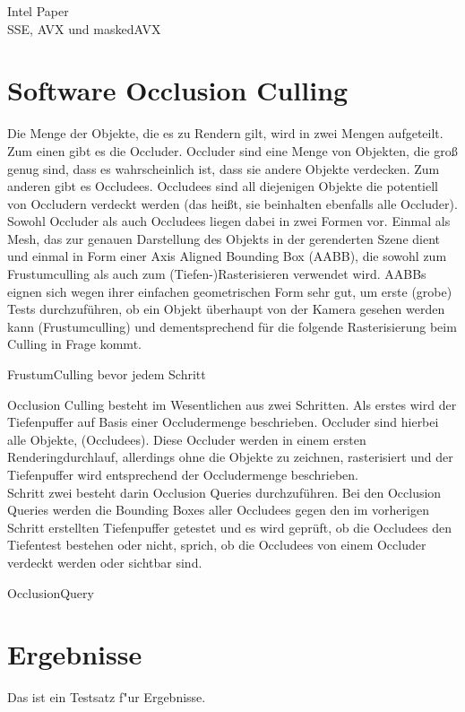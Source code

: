 \documentclass[journal]{vgtc}
\begin{document}
Intel Paper \cite{hpg.20161189}\\
SSE, AVX und maskedAVX\\


\section{Software Occlusion Culling}
Die Menge der Objekte, die es zu Rendern gilt, wird in zwei Mengen aufgeteilt. Zum einen gibt es die Occluder. Occluder sind eine Menge von Objekten, die gro\ss{} genug sind, dass es wahrscheinlich ist, dass sie andere Objekte verdecken. Zum anderen gibt es Occludees. Occludees sind all diejenigen Objekte die potentiell von Occludern verdeckt werden (das hei\ss{}t, sie beinhalten ebenfalls alle Occluder). Sowohl Occluder als auch Occludees liegen dabei in zwei Formen vor. Einmal als Mesh, das zur genauen Darstellung des Objekts in der gerenderten Szene dient und einmal in Form einer Axis Aligned Bounding Box (AABB), die sowohl zum Frustumculling als auch zum (Tiefen-)Rasterisieren verwendet wird. AABBs eignen sich wegen ihrer einfachen geometrischen Form sehr gut, um erste (grobe) Tests durchzuführen, ob ein Objekt überhaupt von der Kamera gesehen werden kann (Frustumculling) und dementsprechend für die folgende Rasterisierung beim Culling in Frage kommt.

FrustumCulling bevor jedem Schritt

Occlusion Culling besteht im Wesentlichen aus zwei Schritten. Als erstes wird der Tiefenpuffer auf Basis einer Occludermenge beschrieben. Occluder sind hierbei alle Objekte,  (Occludees). Diese Occluder werden in einem ersten Renderingdurchlauf, allerdings ohne die Objekte zu zeichnen, rasterisiert und der Tiefenpuffer wird entsprechend der Occludermenge beschrieben.\\
Schritt zwei besteht darin Occlusion Queries durchzuführen. Bei den Occlusion Queries werden die Bounding Boxes aller Occludees gegen den im vorherigen Schritt erstellten Tiefenpuffer getestet und es wird geprüft, ob die Occludees den Tiefentest bestehen oder nicht, sprich, ob die Occludees von einem Occluder verdeckt werden oder sichtbar sind. 

OcclusionQuery

\section{Ergebnisse}
Das ist ein Testsatz f"ur Ergebnisse.
\clearpage
\end{document}
